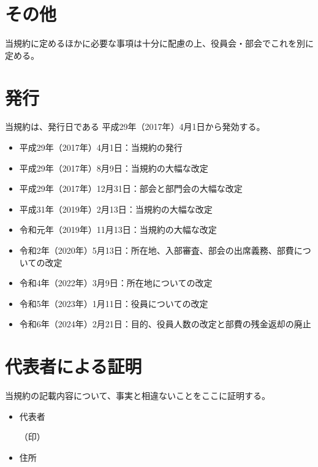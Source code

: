 \documentclass[12pt, unicode, a4paper]{ltjsreport}
\begin{document}
    \section*{その他}
        当規約に定めるほかに必要な事項は十分に配慮の上、役員会・部会でこれを別に定める。

    \section*{発行}
        当規約は、発行日である 平成29年（2017年）4月1日から発効する。
        \begin{itemize}
            \item 平成29年（2017年）4月1日：当規約の発行
            \item 平成29年（2017年）8月9日：当規約の大幅な改定
            \item 平成29年（2017年）12月31日：部会と部門会の大幅な改定
            \item 平成31年（2019年）2月13日：当規約の大幅な改定
            \item 令和元年（2019年）11月13日：当規約の大幅な改定
            \item 令和2年（2020年）5月13日：所在地、入部審査、部会の出席義務、部費についての改定
            \item 令和4年（2022年）3月9日：所在地についての改定
            \item 令和5年（2023年）1月11日：役員についての改定
            \item 令和6年（2024年）2月21日：目的、役員人数の改定と部費の残金返却の廃止
        \end{itemize}

    \section*{代表者による証明}
        当規約の記載内容について、事実と相違ないことをここに証明する。
        \begin{itemize}
            \item 代表者
            \begin{flushright}
                （印）
            \end{flushright}
            \item 住所
        \end{itemize}
\end{document}
